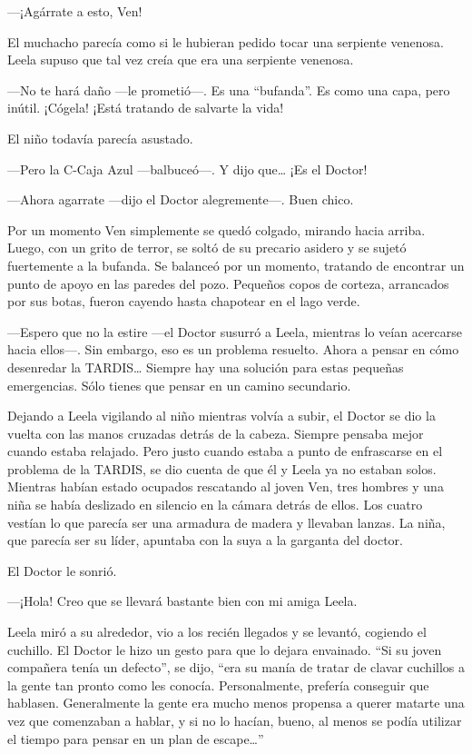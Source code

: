 ---¡Agárrate a esto, Ven!

El muchacho parecía como si le hubieran pedido tocar una serpiente
venenosa. Leela supuso que tal vez creía que era una serpiente venenosa.

---No te hará daño ---le prometió---. Es una ``bufanda''. Es como una
capa, pero inútil. ¡Cógela! ¡Está tratando de salvarte la vida!

El niño todavía parecía asustado.

---Pero la C-Caja Azul ---balbuceó---. Y dijo que\ldots{} ¡Es el Doctor!

---Ahora agarrate ---dijo el Doctor alegremente---. Buen chico.

Por un momento Ven simplemente se quedó colgado, mirando hacia arriba.
Luego, con un grito de terror, se soltó de su precario asidero y se
sujetó fuertemente a la bufanda. Se balanceó por un momento, tratando de
encontrar un punto de apoyo en las paredes del pozo. Pequeños copos de
corteza, arrancados por sus botas, fueron cayendo hasta chapotear en el
lago verde.

---Espero que no la estire ---el Doctor susurró a Leela, mientras lo
veían acercarse hacia ellos---. Sin embargo, eso es un problema
resuelto. Ahora a pensar en cómo desenredar la TARDIS\ldots{} Siempre
hay una solución para estas pequeñas emergencias. Sólo tienes que pensar
en un camino secundario.

Dejando a Leela vigilando al niño mientras volvía a subir, el Doctor se
dio la vuelta con las manos cruzadas detrás de la cabeza. Siempre
pensaba mejor cuando estaba relajado. Pero justo cuando estaba a punto
de enfrascarse en el problema de la TARDIS, se dio cuenta de que él y
Leela ya no estaban solos. Mientras habían estado ocupados rescatando al
joven Ven, tres hombres y una niña se había deslizado en silencio en la
cámara detrás de ellos. Los cuatro vestían lo que parecía ser una
armadura de madera y llevaban lanzas. La niña, que parecía ser su líder,
apuntaba con la suya a la garganta del doctor.

El Doctor le sonrió.

---¡Hola! Creo que se llevará bastante bien con mi amiga Leela.

Leela miró a su alrededor, vio a los recién llegados y se levantó,
cogiendo el cuchillo. El Doctor le hizo un gesto para que lo dejara
envainado. ``Si su joven compañera tenía un defecto'', se dijo, ``era su
manía de tratar de clavar cuchillos a la gente tan pronto como les
conocía. Personalmente, prefería conseguir que hablasen. Generalmente la
gente era mucho menos propensa a querer matarte una vez que comenzaban a
hablar, y si no lo hacían, bueno, al menos se podía utilizar el tiempo
para pensar en un plan de escape\ldots{}''

